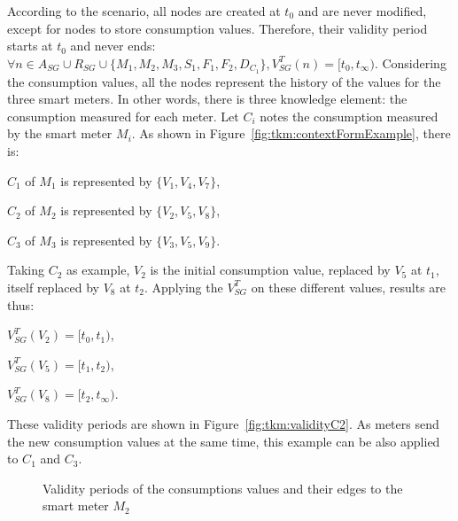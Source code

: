 According to the scenario, all nodes are created at $t_0$ and are never modified, except for nodes to store consumption values.
Therefore, their validity period starts at $t_0$ and never ends: $\forall n \in A_{SG} \cup R_{SG} \cup \{M_1, M_2, M_3, S_1, F_1, F_2, D_{C_1}\}, V^T_{SG}(n) = [t_0, t_\infty)$.
Considering the consumption values, all the nodes represent the history of the values for the three smart meters.
In other words, there is three knowledge element: the consumption measured for each meter.
Let $C_i$ notes the consumption measured by the smart meter $M_i$.
As shown in Figure~\ref{fig:tkm:contextFormExample}, there is:
\begin{condItemize}
	\item $C_1$ of $M_1$ is represented by $\{V_1, V_4, V_7\}$,
	\item $C_2$ of $M_2$ is represented by $\{V_2, V_5, V_8\}$,
	\item $C_3$ of $M_3$ is represented by $\{V_3, V_5, V_9\}$.
\end{condItemize}
Taking $C_2$ as example, $V_2$ is the initial consumption value, replaced by $V_5$ at $t_1$, itself replaced by $V_8$ at $t_2$. 
Applying the $V_{SG}^T$ on these different values, results are thus:
\begin{condItemize}
	\item $V_{SG}^T(V_2) = [t_0, t_1)$,
	\item $V_{SG}^T(V_5) = [t_1, t_2)$,
	\item $V_{SG}^T(V_8) = [t_2, t_\infty)$.
\end{condItemize}
These validity periods are shown in Figure~\ref{fig:tkm:validityC2}.
As meters send the new consumption values at the same time, this example can be also applied to $C_1$ and $C_3$.


\begin{figure}
	\centering
	\hfil
	\caption{Validity periods of the consumptions values and their edges to the smart meter $M_2$}
\end{figure}

